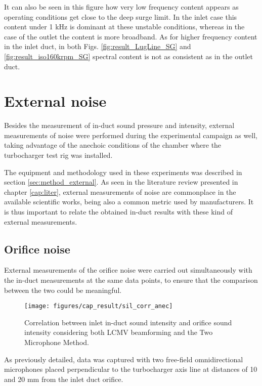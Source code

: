 It can also be seen in this figure how very low frequency content appears as operating conditions get close to the deep surge limit. In the inlet case this content under 1 kHz is dominant at these unstable conditions, whereas in the case of the outlet the content is more broadband. As for higher frequency content in the inlet duct, in both Figs. \ref{fig:result_LugLine_SG} and \ref{fig:result_iso160krpm_SG} spectral content is not as consistent as in the outlet duct.

\section{External noise}
\label{sec:external_results}

Besides the measurement of in-duct sound pressure and intensity, external measurements of noise were performed during the experimental campaign as well, taking advantage of the anechoic conditions of the chamber where the turbocharger test rig was installed. 

The equipment and methodology used in these experiments was described in section \ref{sec:method_external}. As seen in the literature review presented in chapter \ref{cap:liter}, external measurements of noise are commonplace in the available scientific works, being also a common metric used by manufacturers. It is thus important to relate the obtained in-duct results with these kind of external measurements.

\subsection{Orifice noise}

External measurements of the orifice noise were carried out simultaneously with the in-duct measurements at the same data points, to ensure that the comparison between the two could be meaningful. 

\begin{figure}[b!]
\centering
\texttt{[image: figures/cap\_result/sil\_corr\_anec]}
\caption[Correlation between in-duct and orifice sound intensity]{Correlation between inlet in-duct sound intensity and orifice sound intensity considering both LCMV beamforming and the Two Microphone Method.}
\label{fig:sil_corr_aneic}
\end{figure}

As previously detailed, data was captured with two free-field omnidirectional microphones placed perpendicular to the turbocharger axis line at distances of 10 and 20 mm from the inlet duct orifice.

